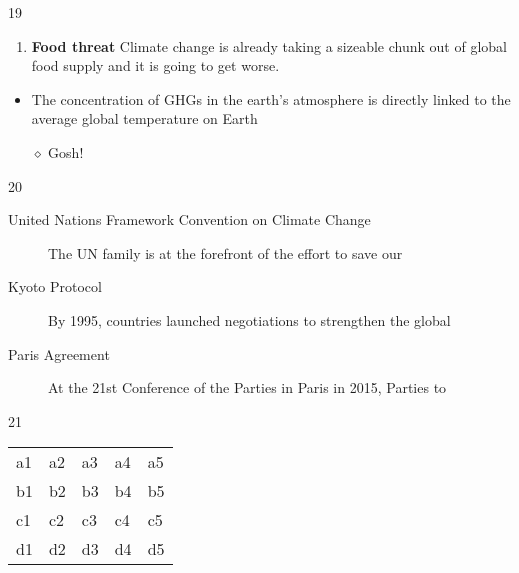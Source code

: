 \documentclass{article} %
\begin{document}


19

	
\begin{enumerate}
\item\textbf{Food threat}
Climate change is already taking a sizeable chunk out of global food
supply and it is going to get worse.

\end{enumerate}

\begin{itemize}
\item The concentration of GHGs in the earth’s atmosphere is directly 
linked to the average global temperature on Earth
\item[$\diamond$] Gosh!

\end{itemize}

20 


\begin{description}
	\item[United Nations Framework Convention on Climate Change]\hfil\newline
	The UN family is at the forefront of the effort to save our 
	
	\item[Kyoto Protocol]
	
	By 1995, countries launched negotiations to strengthen the global
	
	\item[Paris Agreement]
	At the 21st Conference of the Parties in Paris in 2015, Parties to

\end{description}

21


  \begin{tabular}{lllll}
	a1 & a2 & a3 & a4 & a5 \\
	b1 & b2 & b3 & b4 & b5 \\
	c1 & c2 & c3 & c4 & c5 \\
	d1 & d2 & d3 & d4 & d5 \\
\end{tabular}
\end{document}
